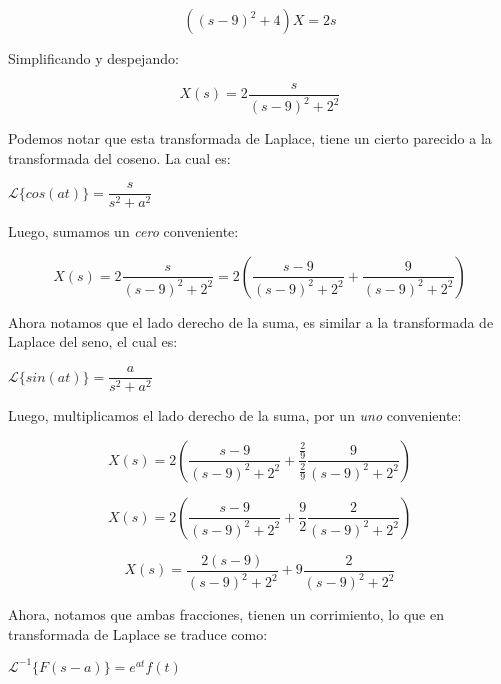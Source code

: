 \documentclass[12pt,letterpaper]{article}
\begin{document}
\begin{equation}((s-9)^2+4)X=2s\end{equation}

Simplificando y despejando:

\begin{equation}X(s)=2\dfrac{s}{(s-9)^2+2^2}\end{equation}

Podemos notar que esta transformada de Laplace, tiene un cierto parecido a la transformada del coseno. La cual es:

\begin{center}
	$\mathcal{L}\{cos(at)\} = \dfrac{s}{s^2+a^2}$
\end{center}

Luego, sumamos un \textit{cero} conveniente:

\begin{equation}X(s) = 2\dfrac{s}{(s-9)^2+2^2} = 2\left(\dfrac{s-9}{(s-9)^2+2^2} + \dfrac{9}{(s-9)^2+2^2}\right)\end{equation}
\newpage

Ahora notamos que el lado derecho de la suma, es similar a la transformada de Laplace del seno, el cual es:

\begin{center}
	$\mathcal{L}\{sin(at)\} = \dfrac{a}{s^2+a^2}$
\end{center}

Luego, multiplicamos el lado derecho de la suma, por un \textit{uno} conveniente:

\begin{equation*}X(s) = 2\left(\dfrac{s-9}{(s-9)^2+2^2} + \dfrac{\frac{2}{9}}{\frac{2}{9}}\dfrac{9}{(s-9)^2+2^2}\right)\end{equation*}

\begin{equation*}X(s) = 2\left(\dfrac{s-9}{(s-9)^2+2^2} + \dfrac{9}{2}\dfrac{2}{(s-9)^2+2^2}\right) \end{equation*}

\begin{equation}X(s) = \dfrac{2(s-9)}{(s-9)^2+2^2} + 9\dfrac{2}{(s-9)^2+2^2} \end{equation}

Ahora, notamos que ambas fracciones, tienen un corrimiento, lo que en transformada de Laplace se traduce como:

\begin{center}
	$\mathcal{L}^{-1}\{F(s-a)\} = e^{at}f(t)$
\end{center}
\end{document}
